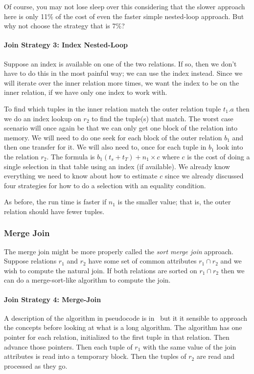 Of course, you may not lose sleep over this considering that the slower approach here is only 11\% of the cost of even the faster simple nested-loop approach. But why not choose the strategy that is 7\%? 

\paragraph{Join Strategy 3: Index Nested-Loop}
Suppose an index is available on one of the two relations. If so, then we don't have to do this in the most painful way; we can use the index instead. Since we will iterate over the inner relation more times, we want the index to be on the inner relation, if we have only one index to work with.

To find which tuples in the inner relation match the outer relation tuple $t_{1}.a$ then we do an index lookup on $r_{2}$ to find the tuple(s) that match. The worst case scenario will once again be that we can only get one block of the relation into memory. We will need to do one seek for each block of the outer relation $b_{1}$ and then one transfer for it. We will also need to, once for each tuple in $b_{1}$ look into the relation $r_{2}$. The formula is $b_{1} ( t_{s} + t_{T} ) + n_{1} \times c$  where $c$ is the cost of doing a single selection in that table using an index (if available). We already know everything we need to know about how to estimate $c$ since we already discussed four strategies for how to do a selection with an equality condition.

As before, the run time is faster if $n_{1}$ is the smaller value; that is, the outer relation should have fewer tuples. 

\subsubsection*{Merge Join}
The merge join might be more properly called the \textit{sort merge join} approach. Suppose relations $r_{1}$ and $r_{2}$ have some set of common attributes $r_{1} \cap r_{2}$ and we wish to compute the natural join. If both relations are sorted on  $r_{1} \cap r_{2}$ then we can do a merge-sort-like algorithm to compute the join.

\paragraph{Join Strategy 4: Merge-Join}
A description of the algorithm in pseudocode is in~\cite{dsc} but it it sensible to approach the concepts before looking at what is a long algorithm. The algorithm has one pointer for each relation, initialized to the first tuple in that relation. Then advance those pointers. Then each tuple of $r_{1}$ with the same value of the join attributes is read into a temporary block. Then the tuples of $r_{2}$ are read and processed as they go.

